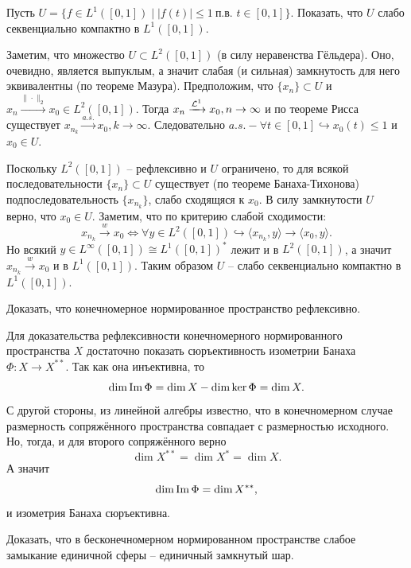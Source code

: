 \begin{task}[10.14]
    Пусть $U = \{f \in L^1([0, 1]) \mid |f(t)| \leq 1 \ \text{п.в. } t \in [0, 1] \}$.
    Показать, что $U$ слабо секвенциально компактно в $L^1([0, 1])$.
\end{task}
\begin{solution}
    Заметим, что множество $U \subset L^2([0, 1])$ (в силу неравенства Гёльдера).
    Оно, очевидно, является выпуклым, а значит слабая (и сильная) замкнутость для него эквивалентны (по теореме Мазура).
    Предположим, что $\{x_n\} \subset U$ и $x_n \xrightarrow{\|\cdot\|_2} x_0 \in L^2([0, 1])$.
    Тогда $x_n \xrightarrow{\mathcal{L}^1} x_0, n \rightarrow \infty$ и по теореме Рисса существует $x_{n_k} \xrightarrow{a.s.} x_0, k \rightarrow \infty$.
    Следовательно $a.s.-\forall t \in [0, 1] \hookrightarrow x_0(t) \leq 1$ и $x_0 \in U$.

    Поскольку $L^2([0, 1])$ -- рефлексивно и $U$ ограничено, то для всякой последовательности $\{x_n\} \subset U$ существует (по теореме Банаха-Тихонова) подпоследовательность $\{x_{n_k}\}$, слабо сходящяся к $x_0$.
    В силу замкнутости $U$ верно, что $x_0 \in U$.
    Заметим, что по критерию слабой сходимости:
    \[
        x_{n_k} \xrightarrow{w} x_0 \Longleftrightarrow \forall y \in L^2([0, 1]) \hookrightarrow \langle x_{n_k}, y \rangle \rightarrow \langle x_0, y \rangle.
    \]
    Но всякий $y \in L^{\infty}([0, 1]) \cong L^1([0, 1])^*$ лежит и в $L^2([0, 1])$, а значит $x_{n_k} \xrightarrow{w} x_0$ и в $L^1([0, 1])$.
    Таким образом $U$ -- слабо секвенциально компактно в $L^1([0, 1])$.
\end{solution}
\begin{task}[T1]
    Доказать, что конечномерное нормированное пространство рефлексивно.
\end{task}
\begin{solution}
    Для доказательства рефлексивности конечномерного нормированного пространства $X$ достаточно показать сюръективность изометрии Банаха $\Phi\colon X \to X^{**}$.
    Так как она инъективна, то
    \[
        \dim \operatorname{Im} \Phi = \dim X - \dim \ker \Phi = \dim X.
    \]
    С другой стороны, из линейной алгебры известно, что в конечномерном случае размерность сопряжённого пространства совпадает с размерностью исходного.
    Но, тогда, и для второго сопряжённого верно
    \[
        \dim X^{**} = \dim X^* = \dim X.
    \]
    А значит
    \[
        \dim \operatorname{Im} \Phi = \dim X^{**},
    \]
    и изометрия Банаха сюръективна.
\end{solution}
\begin{task}[T2]
    Доказать, что в бесконечномерном нормированном пространстве слабое замыкание единичной сферы -- единичный замкнутый шар.
\end{task}
